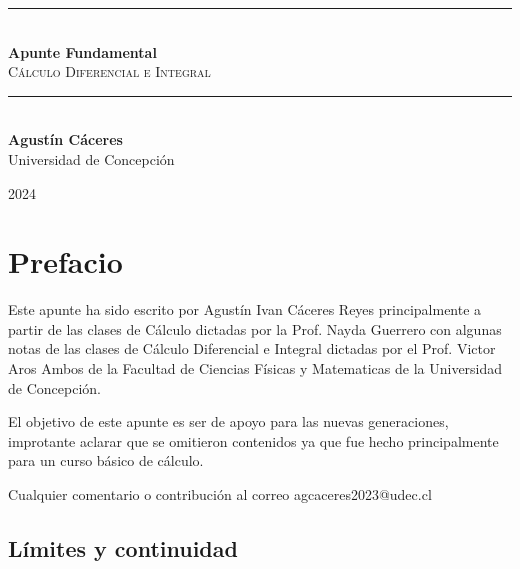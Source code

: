 \documentclass[12pt]{article}
\begin{document}
 

\begin{titlepage}
    \centering
    \vspace*{\fill} 
    
    \rule{\linewidth}{0.5mm} \\[0.4cm]
    {\Huge \bfseries Apunte Fundamental} \\[0.4cm]
    {\huge \scshape Cálculo Diferencial e Integral} \\
    \rule{\linewidth}{0.5mm} \\[1.5cm]
    
    \Large \textbf{Agustín Cáceres} \\
    \large Universidad de Concepción\\
    \vfill 
    
    {\large 2024}
    
    \vspace*{\fill} 
\end{titlepage}

\chapter{\Huge Prefacio}

Este apunte ha sido escrito por Agustín Ivan Cáceres Reyes principalmente a partir de las clases de Cálculo dictadas por la Prof. Nayda Guerrero con algunas notas de las clases de Cálculo Diferencial e Integral dictadas por el Prof. Victor Aros Ambos de la Facultad de Ciencias Físicas y Matematicas de la Universidad de Concepción.

El objetivo de este apunte es ser de apoyo para las nuevas generaciones, improtante aclarar que se omitieron contenidos ya que fue hecho principalmente para un curso básico de cálculo.

Cualquier comentario o contribución al correo agcaceres2023@udec.cl
\newpage
\tableofcontents
\newpage


\section{Límites y continuidad}
\end{document}
